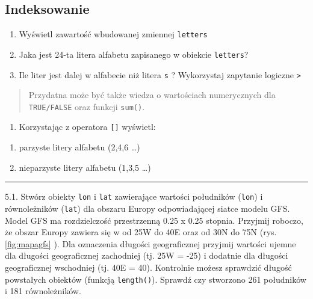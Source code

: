 \documentclass[]{book}
\providecommand{\tightlist}{%
  \setlength{\itemsep}{0pt}\setlength{\parskip}{0pt}}
\theoremstyle{definition}
\theoremstyle{definition}
\theoremstyle{definition}
\theoremstyle{remark}
\begin{document}
\subsection{Indeksowanie}\label{indeksowanie}

\begin{enumerate}
\def\labelenumi{\arabic{enumi}.}
\item
  Wyświetl zawartość wbudowanej zmiennej \texttt{letters}
\item
  Jaka jest 24-ta litera alfabetu zapisanego w obiekcie
  \texttt{letters}?
\item
  Ile liter jest dalej w alfabecie niż litera \texttt{s} ? Wykorzystaj
  zapytanie logiczne \texttt{\textgreater{}}
\end{enumerate}

\begin{quote}
Przydatna może być także wiedza o wartościach numerycznych dla
\texttt{TRUE/FALSE} oraz funkcji \texttt{sum()}.
\end{quote}

\begin{enumerate}
\def\labelenumi{\arabic{enumi}.}
\setcounter{enumi}{3}
\tightlist
\item
  Korzystając z operatora \texttt{{[}{]}} wyświetl:
\end{enumerate}

\begin{enumerate}
\def\labelenumi{\alph{enumi})}
\tightlist
\item
  parzyste litery alfabetu (2,4,6 \ldots{})
\item
  nieparzyste litery alfabetu (1,3,5 \ldots{})
\end{enumerate}

\begin{center}\rule{0.5\linewidth}{\linethickness}\end{center}

5.1. Stwórz obiekty \texttt{lon} i \texttt{lat} zawierające wartości
południków (\texttt{lon}) i równoleżników (\texttt{lat}) dla obszaru
Europy odpowiadającej siatce modelu GFS. Model GFS ma rozdzielczość
przestrzenną 0.25 x 0.25 stopnia. Przyjmij roboczo, że obszar Europy
zawiera się w od 25W do 40E oraz od 30N do 75N (rys. \ref{fig:mapagfs}
). Dla oznaczenia długości geograficznej przyjmij wartości ujemne dla
długości geograficznej zachodniej (tj. 25W = -25) i dodatnie dla
długości geograficznej wschodniej (tj. 40E = 40). Kontrolnie możesz
sprawdzić długość powstałych obiektów (funkcją \texttt{length()}).
Sprawdź czy stworzono 261 południków i 181 równoleżników.
\end{document}
